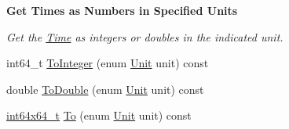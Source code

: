 \begin{Indent}{\bf Get Times as Numbers in Specified Units}\par
{\em Get the \hyperlink{classns3_1_1Time}{Time} as integers or doubles in the indicated unit. }\begin{DoxyCompactItemize}
\item 
int64\+\_\+t \hyperlink{classns3_1_1Time_a0c9c8fb9ec7222c7799c1081f14f6031}{To\+Integer} (enum \hyperlink{classns3_1_1Time_a87a7f4d29c68b047a72d291ad660295a}{Unit} unit) const 
\item 
double \hyperlink{classns3_1_1Time_a5fc320666cc3f9b379e64e9263e332b3}{To\+Double} (enum \hyperlink{classns3_1_1Time_a87a7f4d29c68b047a72d291ad660295a}{Unit} unit) const 
\item 
\hyperlink{classint64x64__t}{int64x64\+\_\+t} \hyperlink{classns3_1_1Time_a04904d9cb915f816b62df3d4e65ce78c}{To} (enum \hyperlink{classns3_1_1Time_a87a7f4d29c68b047a72d291ad660295a}{Unit} unit) const 
\end{DoxyCompactItemize}
\end{Indent}

